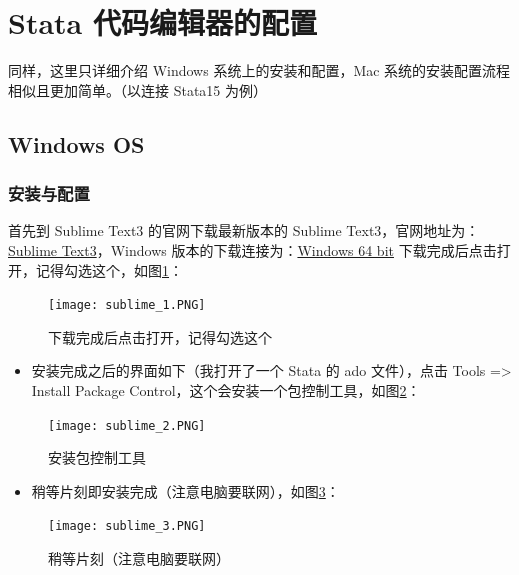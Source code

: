 \documentclass[cn,fancy,blue,11pt]{elegantbook}
\begin{document}
\hypertarget{stata--1}{%
\section{Stata 代码编辑器的配置}\label{stata--1}}

同样，这里只详细介绍 Windows 系统上的安装和配置，Mac 系统的安装配置流程相似且更加简单。（以连接 Stata15 为例）

\hypertarget{windows-os-2}{%
\subsection{Windows OS}\label{windows-os-2}}

\hypertarget{section-8}{%
\subsubsection{安装与配置}\label{section-8}}

首先到 Sublime Text3 的官网下载最新版本的 Sublime Text3，官网地址为：\href{https://www.sublimetext.com/}{Sublime Text3}，Windows 版本的下载连接为：\href{https://download.sublimetext.com/Sublime\%20Text\%20Build\%203176\%20x64\%20Setup.exe}{Windows 64 bit}
下载完成后点击打开，记得勾选这个，如图\ref{fig:sublime_1}：

\begin{figure}[htbp]
  \centering
  \texttt{[image: sublime\_1.PNG]}
  \caption{下载完成后点击打开，记得勾选这个}
  \label{fig:sublime_1}
\end{figure}

\begin{itemize}
  \item 安装完成之后的界面如下（我打开了一个 Stata 的 ado 文件），点击 Tools =\textgreater{} Install Package Control，这个会安装一个包控制工具，如图\ref{fig:sublime_2}：
\end{itemize}

\begin{figure}[htbp]
  \centering
  \texttt{[image: sublime\_2.PNG]}
  \caption{安装包控制工具}
  \label{fig:sublime_2}
\end{figure}

\begin{itemize}
  \item 稍等片刻即安装完成（注意电脑要联网），如图\ref{fig:sublime_3}：
\end{itemize}

\begin{figure}[htbp]
  \centering
  \texttt{[image: sublime\_3.PNG]}
  \caption{稍等片刻（注意电脑要联网）}
  \label{fig:sublime_3}
\end{figure}
\end{document}
